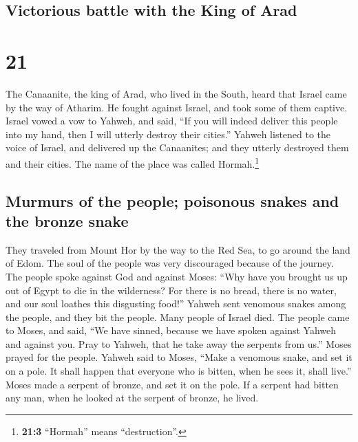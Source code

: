 \hypertarget{victorious-battle-with-the-king-of-arad}{%
\subsection{Victorious battle with the King of
Arad}\label{victorious-battle-with-the-king-of-arad}}

\hypertarget{section-20}{%
\section{21}\label{section-20}}

 The Canaanite, the king of Arad, who lived in the South,
heard that Israel came by the way of Atharim. He fought against Israel,
and took some of them captive.  Israel vowed a vow to
Yahweh, and said, ``If you will indeed deliver this people into my hand,
then I will utterly destroy their cities.''  Yahweh
listened to the voice of Israel, and delivered up the Canaanites; and
they utterly destroyed them and their cities. The name of the place was
called Hormah.\footnote{\textbf{21:3} ``Hormah'' means ``destruction''.}

\hypertarget{murmurs-of-the-people-poisonous-snakes-and-the-bronze-snake}{%
\subsection{Murmurs of the people; poisonous snakes and the bronze
snake}\label{murmurs-of-the-people-poisonous-snakes-and-the-bronze-snake}}

 They traveled from Mount Hor by the way to the Red Sea,
to go around the land of Edom. The soul of the people was very
discouraged because of the journey.  The people spoke
against God and against Moses: ``Why have you brought us up out of Egypt
to die in the wilderness? For there is no bread, there is no water, and
our soul loathes this disgusting food!''  Yahweh sent
venomous snakes among the people, and they bit the people. Many people
of Israel died.  The people came to Moses, and said, ``We
have sinned, because we have spoken against Yahweh and against you. Pray
to Yahweh, that he take away the serpents from us.'' Moses prayed for
the people.  Yahweh said to Moses, ``Make a venomous
snake, and set it on a pole. It shall happen that everyone who is
bitten, when he sees it, shall live.''  Moses made a
serpent of bronze, and set it on the pole. If a serpent had bitten any
man, when he looked at the serpent of bronze, he lived.


